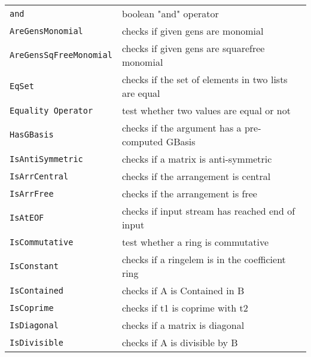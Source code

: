 \documentclass[a4paper]{mybook}
\begin{document}
\begin{center}
\begin{longtable}{ll}
   
{\verb~and~} &
      boolean "and" operator\\
   
{\verb~AreGensMonomial~} &
      checks if given gens are monomial\\
   
{\verb~AreGensSqFreeMonomial~} &
      checks if given gens are squarefree monomial\\
   
{\verb~EqSet~} &
      checks if the set of elements in two lists are equal\\
   
{\verb~Equality Operator~} &
      test whether two values are equal or not\\
   
{\verb~HasGBasis~} &
      checks if the argument has a pre-computed GBasis\\
   
{\verb~IsAntiSymmetric~} &
      checks if a matrix is anti-symmetric\\
   
{\verb~IsArrCentral~} &
      checks if the arrangement is central\\
   
{\verb~IsArrFree~} &
      checks if the arrangement is free\\
   
{\verb~IsAtEOF~} &
      checks if input stream has reached end of input\\
   
{\verb~IsCommutative~} &
      test whether a ring is commutative\\
   
{\verb~IsConstant~} &
      checks if a ringelem is in the coefficient ring\\
   
{\verb~IsContained~} &
      checks if A is Contained in B\\
   
{\verb~IsCoprime~} &
      checks if t1 is coprime with t2\\
   
{\verb~IsDiagonal~} &
      checks if a matrix is diagonal\\
   
{\verb~IsDivisible~} &
      checks if A is divisible by B\\
   

\end{longtable}
\end{center}
\end{document}
